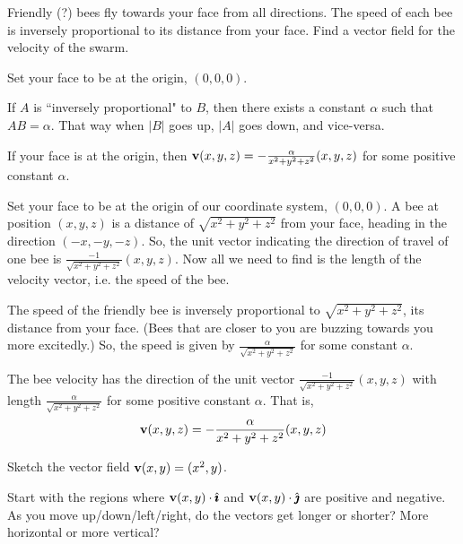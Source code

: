 \begin{question}
Friendly (?) bees fly towards your face from all directions. The  speed of each bee is inversely proportional to its distance from your face.  Find a vector field for the velocity of the swarm.
\end{question}

\begin{hint} 
Set your face to be at the origin, $(0,0,0)$. 

If $A$ is ``inversely proportional" to $B$, then there exists a constant $\alpha$ such that $AB=\alpha$. That way when $|B|$ goes up, $|A|$ goes down, and vice-versa.
\end{hint}

\begin{answer} 
If your face is at the origin, then $\mathbf{v}(x,y,z)=-\frac{\alpha}{{x^2+y^2+z^2}}(x,y,z)$ for some positive constant $\alpha$.
\end{answer}

\begin{solution}
Set your face to be at the origin of our coordinate system, $(0,0,0)$. A bee at position $(x,y,z)$ is a distance of $\sqrt{x^2+y^2+z^2}$ from your face, heading in the direction $(-x,-y,-z)$. So, the unit vector indicating the direction of travel of one bee is $\frac{-1}{\sqrt{x^2+y^2+z^2}}(x,y,z)$. Now all we need to find is the length of the velocity vector, i.e. the speed of the bee.

The speed of the friendly bee is inversely proportional to $\sqrt{x^2+y^2+z^2}$, its distance from your face. (Bees that are closer to you are buzzing towards you more excitedly.) So, the speed is given by $\frac{\alpha}{\sqrt{x^2+y^2+z^2}}$ for some constant $\alpha$. 

The bee velocity has the direction of the unit vector $\frac{-1}{\sqrt{x^2+y^2+z^2}}(x,y,z)$ with length  $\frac{\alpha}{\sqrt{x^2+y^2+z^2}}$ for some positive constant $\alpha$. That is,
\[\mathbf{v}(x,y,z)=-\frac{\alpha}{{x^2+y^2+z^2}}(x,y,z)\]
\end{solution}

\begin{question}
Sketch the vector field 
$\mathbf{v}(x,y)=(x^2,y)$.
\end{question}

\begin{hint} 
Start with the regions where $\mathbf{v}(x,y)\cdot\hat{\pmb{\imath}}$ and $\mathbf{v}(x,y)\cdot\hat{\pmb{\jmath}}$ are positive and negative. As you move up/down/left/right, do the vectors get longer or shorter? More horizontal or more vertical?
\end{hint}

